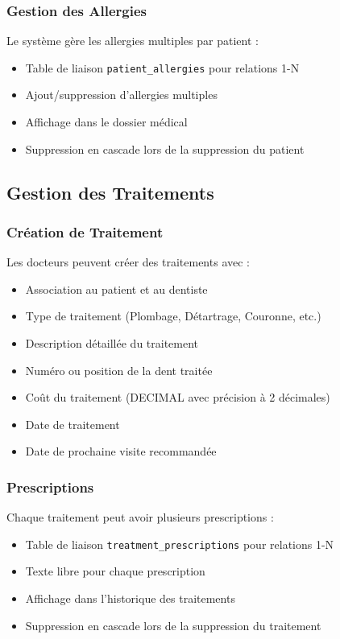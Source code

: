 \documentclass[12pt,a4paper]{report}
\begin{document}
\subsubsection{Gestion des Allergies}

Le système gère les allergies multiples par patient :
\begin{itemize}
    \item Table de liaison \texttt{patient\_allergies} pour relations 1-N
    \item Ajout/suppression d'allergies multiples
    \item Affichage dans le dossier médical
    \item Suppression en cascade lors de la suppression du patient
\end{itemize}

\subsection{Gestion des Traitements}

\subsubsection{Création de Traitement}

Les docteurs peuvent créer des traitements avec :
\begin{itemize}
    \item Association au patient et au dentiste
    \item Type de traitement (Plombage, Détartrage, Couronne, etc.)
    \item Description détaillée du traitement
    \item Numéro ou position de la dent traitée
    \item Coût du traitement (DECIMAL avec précision à 2 décimales)
    \item Date de traitement
    \item Date de prochaine visite recommandée
\end{itemize}

\subsubsection{Prescriptions}

Chaque traitement peut avoir plusieurs prescriptions :
\begin{itemize}
    \item Table de liaison \texttt{treatment\_prescriptions} pour relations 1-N
    \item Texte libre pour chaque prescription
    \item Affichage dans l'historique des traitements
    \item Suppression en cascade lors de la suppression du traitement
\end{itemize}
\end{document}
